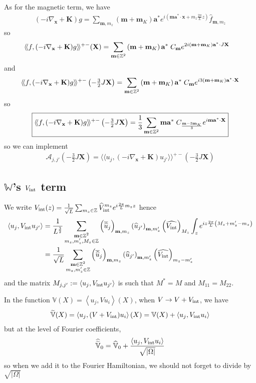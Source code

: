 \documentclass[11pt,a4paper,reqno,french,tikz]{amsart}
\newcommand\cA{\mathcal{A}}\newcommand\cB{\mathcal{B}}\newcommand\cC{\mathcal{C}}\newcommand\cD{\mathcal{D}}\newcommand\cE{\mathcal{E}}\newcommand\cF{\mathcal{F}}\newcommand\cG{\mathcal{G}}\newcommand\cH{\mathcal{H}}\newcommand\cI{\mathcal{I}}\newcommand\cJ{\mathcal{J}}\newcommand\cK{\mathcal{K}}\newcommand\cL{\mathcal{L}}\newcommand\cM{\mathcal{M}}\newcommand\cN{\mathcal{N}}\newcommand\cO{\mathcal{O}}\newcommand\cP{\mathcal{P}}\newcommand\cQ{\mathcal{Q}}\newcommand\cR{\mathcal{R}}\newcommand\cS{\mathcal{S}}\newcommand\cT{\mathcal{T}}\newcommand\cU{\mathcal{U}}\newcommand\cV{\mathcal{V}}\newcommand\cW{\mathcal{W}}\newcommand\cX{\mathcal{X}}\newcommand\cY{\mathcal{Y}}\newcommand\cZ{\mathcal{Z}}
\newcommand{\pa}[1]{\left( #1 \right)} %
\newcommand{\ab}[1]{\left|#1\right|} %
\newcommand{\ps}[1]{\left< #1 \right>} %
\newcommand{\na}{\nabla} %
\newcommand{\f}[2]{\frac{#1}{#2}} %
\newcommand{\ind}[1]{_{\textup{#1}}} %
\newcommand{\bbV}{\mathbb{V}}
\def\bX{{\mathbf X}}
\def\ba{{\mathbf a}}
\def\bx{{\mathbf x}}
\def\bmm{{\mathbf m}}
\def\bK{{\mathbf K}}
\def\bbV{{\mathbb V}}
\def\bbW{{\mathbb W}}
\def\lAngle{\langle\!\langle}
\def\rAngle{\rangle\!\rangle}
\begin{document}
As for the magnetic term, we have
\begin{align*}
\pa{-i\na_\bx + \bK} g = \sum_{\bmm,m_z} \pa{\bmm + \bmm_K} \ba^* e^{i\pa{\bmm \ba^* \cdot \bx + m_z \f{2\pi}L z}} \widehat{f}_{\bmm,m_z}
\end{align*}
so
\begin{align*}
	\lAngle &f, (-i\nabla_\bx+\bK) g \rAngle^{+-}(\bX) =  \sum_{\bmm \in \Z^2} \pa{\bmm + \bmm_K}\ba^* \; C_\bmm e^{2i \pa{\bmm + \bmm_K} \ba^* \cdot J\bX} 
\end{align*}
and
\begin{align*}
\lAngle f, (-i\nabla_\bx+\bK) g \rAngle^{+-}\pa{-\tfrac{3}{2}J\bX} =  \sum_{\bmm \in \Z^2} \pa{\bmm + \bmm_K}\ba^* \; C_\bmm e^{i 3 \pa{\bmm + \bmm_K} \ba^* \cdot \bX}
\end{align*}
so
\begin{align*}
\boxed{\lAngle f, (-i\nabla_\bx+\bK) g \rAngle^{+-}\pa{-\tfrac{3}{2}J\bX} = \f {1}3 \sum_{\bmm \in \Z^2} \bmm \ba^* \; C_{\f{\bmm - 3\bmm_K}{3}} e^{i \bmm \ba^* \cdot \bX} }
\end{align*}
so we can implement
\begin{align*}
\bm{\cA}_{j,j'}\pa{-\tfrac{3}{2}J\bX} = \lAngle u_j, (-i\nabla_\bx+\bK) u_{j'} \rAngle^{+-}\pa{-\tfrac{3}{2}J\bX}
\end{align*}

\subsection{$\bbW$'s $V\ind{int}$ term}%
\label{sub:_bbw_s_vint_term}
We write $V\ind{int}(z) = \f{1}{\sqrt{L}} \sum_{m_z \in \Z} \widehat{V}\ind{int}^{m_z} e^{i \f{2\pi}L m_z z}$ hence
\begin{align*}
	\ps{u_j, V\ind{int} u_{j'}} &= \f{1}{L^{\f 32}} \sum_{\substack{\bmm \in \Z^2 \\ m_z,m_z',M_z \in \Z}} \pa{\overline{\widehat{u}}_j}_{\bmm,m_z} \pa{\widehat{u}_{j'}}_{\bmm,m_z'}\pa{\widehat{V\ind{int}}}_{M_z} \int_z e^{iz \f{2\pi}{L} \pa{M_z + m_z'-m_z}} \\
& = \f{1}{\sqrt{L}} \sum_{\substack{\bmm \in \Z^2 \\ m_z,m_z' \in \Z}} \pa{\overline{\widehat{u}}_j}_{\bmm,m_z} \pa{\widehat{u}_{j'}}_{\bmm,m_z'}\pa{\widehat{V\ind{int}}}_{m_z-m_z'} 
\end{align*}
and the matrix $M_{j,j'} := \ps{u_j, V\ind{int} u_{j'}}$ is such that $M^* = M$ and $M_{11} = M_{22}$.

In the function $\bbV(X) = \ps{u_j,V u_i}(X)$, when $V \rightarrow V+ V\ind{int}$, we have 
\begin{align*}
\widetilde{\bbV}(X) = \ps{u_j,(V+V\ind{int}) u_i}(X) = \bbV(X) + \ps{u_j,V\ind{int} u_i}
\end{align*}
but at the level of Fourier coefficients,
\begin{align*}
\widehat{\widetilde{\bbV}}_0 = \widehat{\bbV}_0 + \f{\ps{u_j,V\ind{int} u_i}}{\sqrt{\ab{\Omega}}}
\end{align*}
so when we add it to the Fourier Hamiltonian, we should not forget to divide by $\sqrt{\ab{\Omega}}$
\end{document}

